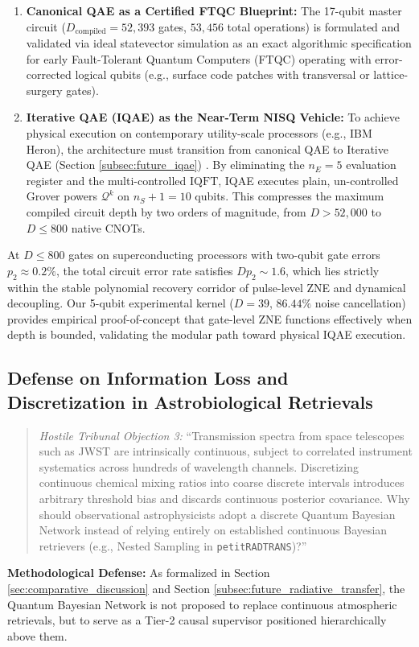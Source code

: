 \begin{enumerate}
    \item \textbf{Canonical QAE as a Certified FTQC Blueprint:} The 17-qubit master circuit ($D_{\mathrm{compiled}} = 52,393$ gates, $53,456$ total operations) is formulated and validated via ideal statevector simulation as an exact algorithmic specification for early Fault-Tolerant Quantum Computers (FTQC) operating with error-corrected logical qubits (e.g., surface code patches with transversal or lattice-surgery gates).
    \item \textbf{Iterative QAE (IQAE) as the Near-Term NISQ Vehicle:} To achieve physical execution on contemporary utility-scale processors (e.g., IBM Heron), the architecture must transition from canonical QAE to Iterative QAE (Section \ref{subsec:future_iqae}) \cite{grinko2021}. By eliminating the $n_E = 5$ evaluation register and the multi-controlled $\mathrm{IQFT}$, IQAE executes plain, un-controlled Grover powers $\mathcal{Q}^k$ on $n_S + 1 = 10$ qubits. This compresses the maximum compiled circuit depth by two orders of magnitude, from $D > 52,000$ to $D \le 800$ native CNOTs.
\end{enumerate}
At $D \le 800$ gates on superconducting processors with two-qubit gate errors $p_2 \approx 0.2\%$, the total circuit error rate satisfies $D p_2 \sim 1.6$, which lies strictly within the stable polynomial recovery corridor of pulse-level ZNE and dynamical decoupling. Our 5-qubit experimental kernel ($D = 39$, $86.44\%$ noise cancellation) provides empirical proof-of-concept that gate-level ZNE functions effectively when depth is bounded, validating the modular path toward physical IQAE execution.

\subsection{Defense on Information Loss and Discretization in Astrobiological Retrievals}
\begin{quote}
\emph{Hostile Tribunal Objection 3:} ``Transmission spectra from space telescopes such as JWST are intrinsically continuous, subject to correlated instrument systematics across hundreds of wavelength channels. Discretizing continuous chemical mixing ratios into coarse discrete intervals introduces arbitrary threshold bias and discards continuous posterior covariance. Why should observational astrophysicists adopt a discrete Quantum Bayesian Network instead of relying entirely on established continuous Bayesian retrievers (e.g., Nested Sampling in \texttt{petitRADTRANS})?''
\end{quote}
\textbf{Methodological Defense:} As formalized in Section \ref{sec:comparative_discussion} and Section \ref{subsec:future_radiative_transfer}, the Quantum Bayesian Network is not proposed to replace continuous atmospheric retrievals, but to serve as a Tier-2 causal supervisor positioned hierarchically above them. 

